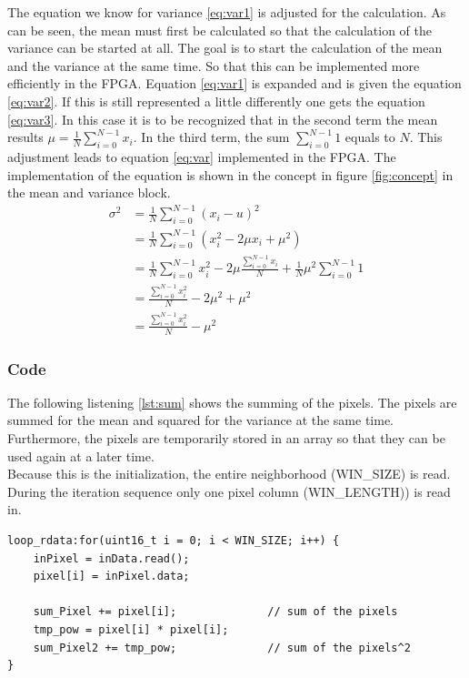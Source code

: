 The equation we know for variance \ref{eq:var1} is adjusted for the calculation.
As can be seen, the mean must first be calculated so that the calculation of the
variance can be started at all. The goal is to start the calculation of the mean
and the variance at the same time. So that this can be implemented more
efficiently in the FPGA.
Equation \ref{eq:var1} is expanded and is given the equation \ref{eq:var2}. If
this is still represented a little differently one gets the equation 
\ref{eq:var3}. In this case it is to be recognized that in the second term the
mean results $\mu = \frac{1}{N} \sum_{i = 0}^{N - 1} x_{i}$. In the third term,
the sum $\sum_{i = 0}^{N - 1} 1$ equals to $N$.
This adjustment leads to equation \ref{eq:var} implemented in the FPGA. The implementation of the equation is shown in the concept in figure \ref{fig:concept} in the mean and variance block.
\begin{align}
    \sigma^{2} & = \frac{1}{N} \sum_{i = 0}^{N - 1} (x_{i} - u)^{2} \label{eq:var1}\\ 
    		& = \frac{1}{N} \sum_{i = 0}^{N - 1} (x_{i}^{2} - 2 \mu x_{i} + \mu^{2})  \label{eq:var2}\\
    		& = \frac{1}{N} \sum_{i = 0}^{N - 1} x_{i}^{2} - 2\mu \frac{\sum_{i = 0}^{N - 1} x_{i}}{N} + \frac{1}{N} \mu^{2} \sum_{i = 0}^{N - 1} 1 \label{eq:var3}\\
    		& = \frac{\sum_{i = 0}^{N - 1} x_{i}^{2}}{N}  - 2\mu^{2} + \mu^{2} \label{eq:var4}\\
    		& = \frac{\sum_{i = 0}^{N - 1} x_{i}^{2}}{N}  - \mu^{2}
    \label{eq:var}
\end{align}

\subsubsection*{Code}
The following listening \ref{lst:sum} shows the summing of the pixels. The pixels are summed for the mean and squared for the variance at the same time. Furthermore, the pixels are temporarily stored in an array so that they can be used again at a later time. \\
Because this is the initialization, the entire neighborhood (WIN\_SIZE) is read. During the iteration sequence only one pixel column (WIN\_LENGTH)) is read in. \\
\begin{minipage}{\textwidth}
\begin{lstlisting}[style=CStyle, caption=Calculation of the sum, label=lst:sum]
loop_rdata:for(uint16_t i = 0; i < WIN_SIZE; i++) {
	inPixel = inData.read();
	pixel[i] = inPixel.data;

	sum_Pixel += pixel[i];				// sum of the pixels
	tmp_pow = pixel[i] * pixel[i];
	sum_Pixel2 += tmp_pow;				// sum of the pixels^2
}
\end{lstlisting}
\end{minipage}


